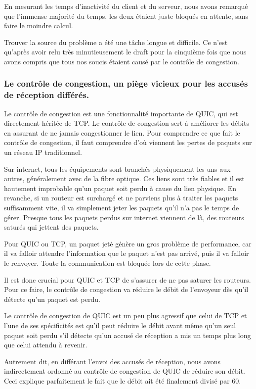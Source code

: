 \vspace{0.5cm}

En mesurant les temps d'inactivité du client et du serveur, nous avons remarqué que l'immense majorité du temps, les deux étaient juste bloqués en attente, sans faire le moindre calcul.

Trouver la source du problème a été une tâche longue et difficile. Ce n'est qu'après avoir relu très minutieusement le draft pour la cinquième fois que nous avons compris que tous nos soucis étaient causé par le contrôle de congestion.

\subsubsection{Le contrôle de congestion, un piège vicieux pour les accusés de réception différés.}

Le contrôle de congestion est une fonctionnalité importante de QUIC, qui est directement héritée de TCP. Le contrôle de congestion sert à améliorer les débits en assurant de ne jamais congestionner le lien.
Pour comprendre ce que fait le contrôle de congestion, il faut comprendre d'où viennent les pertes de paquets sur un réseau IP traditionnel.

Sur internet, tous les équipements sont branchés physiquement les uns aux autres, généralement avec de la fibre optique. Ces liens sont très fiables et il est hautement improbable qu'un paquet soit perdu à cause du lien physique. En revanche, si un routeur est surchargé et ne parviens plus à traiter les paquets suffisamment vite, il va simplement jeter les paquets qu'il n'a pas le temps de gérer.
Presque tous les paquets perdus sur internet viennent de là, des routeurs saturés qui jettent des paquets.

Pour QUIC ou TCP, un paquet jeté génère un gros problème de performance, car il va falloir attendre l'information que le paquet n'est pas arrivé, puis il va falloir le renvoyer. Toute la communication est bloquée lors de cette phase.

Il est donc crucial pour QUIC et TCP de s'assurer de ne pas saturer les routeurs. Pour ce faire, le contrôle de congestion va réduire le débit de l'envoyeur dès qu'il détecte qu'un paquet est perdu.

\vspace{0.5cm}

Le contrôle de congestion de QUIC est un peu plus agressif que celui de TCP et l'une de ses spécificités est qu'il peut réduire le débit avant même qu'un seul paquet soit perdu s'il détecte qu'un accusé de réception a mis un temps plus long que celui attendu à revenir.

Autrement dit, en différant l'envoi des accusés de réception, nous avons indirectement ordonné au contrôle de congestion de QUIC de réduire son débit.
Ceci explique parfaitement le fait que le débit ait été finalement divisé par 60.